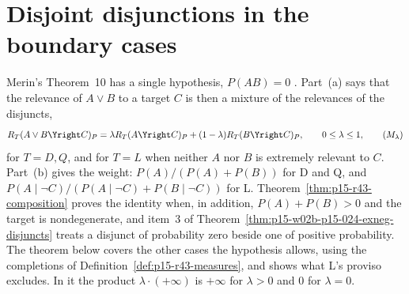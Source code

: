 \section{Disjoint disjunctions in the boundary cases}
\label{sec:p15-w02c-p15-027-disjunction}

Merin's Theorem~10 has a single hypothesis, \(P(AB)=0\)
\cite[p.~273]{Merin2021Relevance}. Part~(a) says that the relevance of
\(A\vee B\) to a target \(C\) is then a mixture of the relevances of the
disjuncts,
\[
 R_T(A\vee B\Yright C)_P=\lambda R_T(A\Yright C)_P
   +(1-\lambda)R_T(B\Yright C)_P,\qquad 0\leq\lambda\leq1,
 \tag{\(M_\lambda\)}
\]
for \(T=D,Q\), and for \(T=L\) when neither \(A\) nor \(B\) is extremely
relevant to \(C\). Part~(b) gives the weight: \(P(A)/(P(A)+P(B))\) for D
and Q, and \(P(A\mid\neg C)/(P(A\mid\neg C)+P(B\mid\neg C))\) for L.
Theorem~\ref{thm:p15-r43-composition} proves the identity when, in
addition, \(P(A)+P(B)>0\) and the target is nondegenerate, and item~3 of
Theorem~\ref{thm:p15-w02b-p15-024-exneg-disjuncts} treats a disjunct of
probability zero beside one of positive probability. The theorem below
covers the other cases the hypothesis allows, using the
completions of Definition~\ref{def:p15-r43-measures}, and shows what
L's proviso excludes. In it the product \(\lambda\cdot(+\infty)\) is
\(+\infty\) for \(\lambda>0\) and \(0\) for \(\lambda=0\).

